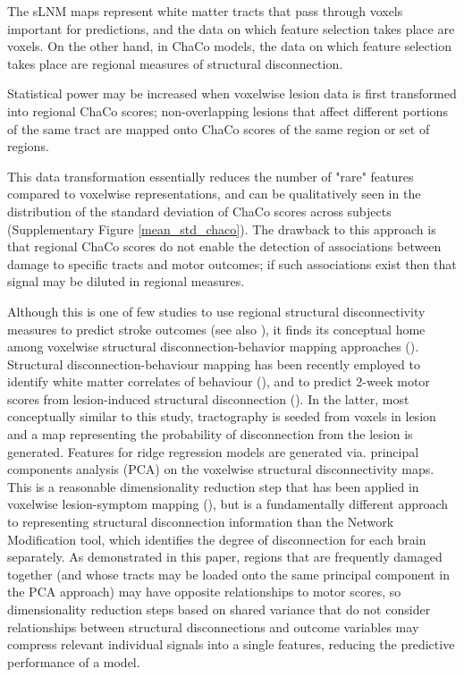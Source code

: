 \documentclass[10pt]{article}
\begin{document}
The sLNM maps represent white matter tracts that pass through voxels important for predictions, and the data on which feature selection takes place are voxels. On the other hand, in ChaCo models, the data on which feature selection takes place are regional measures of structural disconnection. 

Statistical power may be increased when voxelwise lesion data is first transformed into regional ChaCo scores; non-overlapping lesions that affect different portions of the same tract are mapped onto ChaCo scores of the same region or set of regions. 

This data transformation essentially reduces the number of "rare" features compared to voxelwise representations, and can be qualitatively seen in the distribution of the standard deviation of ChaCo scores across subjects (Supplementary Figure \ref{mean_std_chaco}). The drawback to this approach is that regional ChaCo scores do not enable the detection of associations between damage to specific tracts and motor outcomes; if such associations exist then that signal may be diluted in regional measures. 

Although this is one of few studies to use regional structural disconnectivity measures to predict stroke outcomes (see also \cite{Tozlu2020-qa, Kuceyeski2016-vj}), it finds its conceptual home among voxelwise structural disconnection-behavior mapping approaches (\cite{Salvalaggio2020-pe, Wawrzyniak2022-kl, Foulon2018-bj, Sperber2022-oj}). Structural disconnection-behaviour mapping has been recently employed to identify white matter correlates of behaviour (\cite{Wawrzyniak2022-kl, Foulon2018-bj}), and to predict 2-week motor scores from lesion-induced structural disconnection (\cite{Salvalaggio2020-pe}). In the latter, most conceptually similar to this study, tractography is seeded from voxels in lesion and a map representing the probability of disconnection from the lesion is generated. Features for ridge regression models are generated via. principal components analysis (PCA) on the voxelwise structural disconnectivity maps. This is a reasonable dimensionality reduction step that has been applied in voxelwise lesion-symptom mapping (\cite{Ivanova2021-nh}), but is a fundamentally different approach to representing structural disconnection information than the Network Modification tool, which identifies the degree of disconnection for each brain separately. As demonstrated in this paper, regions that are frequently damaged together (and whose tracts may be loaded onto the same principal component in the PCA approach) may have opposite relationships to motor scores, so dimensionality reduction steps based on shared variance that do not consider relationships between structural disconnections and outcome variables may compress relevant individual signals into a single features, reducing the predictive performance of a model. 
\end{document}
